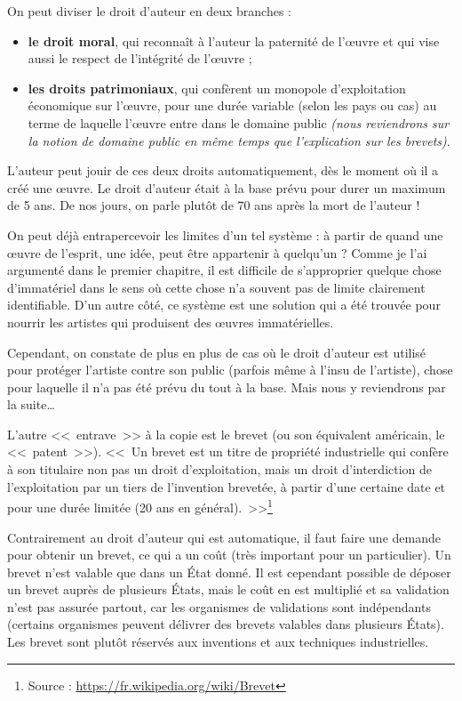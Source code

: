 On peut diviser le droit d'auteur en deux branches :
\begin{itemize}
\item \textbf{le droit moral}, qui reconnaît à l'auteur la paternité de l'œuvre et qui vise aussi le respect de l'intégrité de l'œuvre ;
\item \textbf{les droits patrimoniaux}, qui confèrent un monopole d'exploitation économique sur l'œuvre, pour une durée variable (selon les pays ou cas) au terme de laquelle l'œuvre entre dans le domaine public \textit{(nous reviendrons sur la notion de domaine public en même temps que l'explication sur les brevets)}.
\end{itemize}\bigskip

L'auteur peut jouir de ces deux droits automatiquement, dès le moment où il a créé une œuvre.
Le droit d'auteur était à la base prévu pour durer un maximum de 5 ans.
De nos jours, on parle plutôt de 70 ans après la mort de l'auteur !

On peut déjà entrapercevoir les limites d'un tel système : à partir de quand une œuvre de l'esprit, une idée, peut être appartenir à quelqu'un ?
Comme je l'ai argumenté dans le premier chapitre, il est difficile de s'approprier quelque chose d'immatériel dans le sens où cette chose n'a souvent pas de limite clairement identifiable.
D'un autre côté, ce système est une solution qui a été trouvée pour nourrir les artistes qui produisent des œuvres immatérielles.

Cependant, on constate de plus en plus de cas où le droit d'auteur est utilisé pour protéger l'artiste contre son public (parfois même à l'insu de l'artiste), chose pour laquelle il n'a pas été prévu du tout à la base.
Mais nous y reviendrons par la suite\dots{}

L'autre <<~entrave~>> à la copie est le brevet (ou son équivalent américain, le <<~patent~>>).
<<~Un brevet est un titre de propriété industrielle qui confère à son titulaire non pas un droit d'exploitation, mais un droit d'interdiction de l'exploitation par un tiers de l'invention brevetée, à partir d'une certaine date et pour une durée limitée (20 ans en général).~>>\footnote{Source : \url{https://fr.wikipedia.org/wiki/Brevet}}

Contrairement au droit d'auteur qui est automatique, il faut faire une demande pour obtenir un brevet, ce qui a un coût (très important pour un particulier).
Un brevet n'est valable que dans un État donné.
Il est cependant possible de déposer un brevet auprès de plusieurs États, mais le coût en est multiplié et sa validation n'est pas assurée partout, car les organismes de validations sont indépendants (certains organismes peuvent délivrer des brevets valables dans plusieurs États).
Les brevet sont plutôt réservés aux inventions et aux techniques industrielles.

